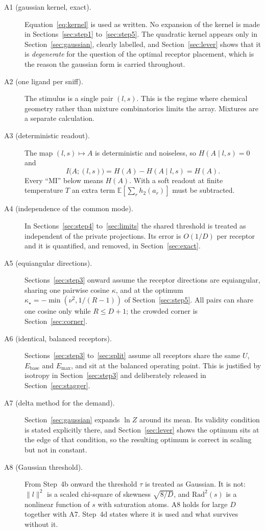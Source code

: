 \documentclass[11pt,a4paper]{article}
\newcommand{\EE}{\mathbb{E}}
\newcommand{\htwo}{h_2}
\newcommand{\Ebase}{E_{\mathrm{base}}}
\newcommand{\Emax}{E_{\mathrm{max}}}
\begin{document}
\begin{description}
  \item[A1 (gaussian kernel, exact).] Equation~\eqref{eq:kernel} is used as written. No
    expansion of the kernel is made in Sections~\ref{sec:step1} to~\ref{sec:step5}. The
    quadratic kernel appears only in Section~\ref{sec:gaussian}, clearly labelled, and
    Section~\ref{sec:lever} shows that it is \emph{degenerate} for the question of the
    optimal receptor placement, which is the reason the gaussian form is carried
    throughout.
  \item[A2 (one ligand per sniff).] The stimulus is a single pair $(l,s)$. This is the
    regime where chemical geometry rather than mixture combinatorics limits the array.
    Mixtures are a separate calculation.
  \item[A3 (deterministic readout).] The map $(l,s)\mapsto A$ is deterministic and
    noiseless, so $H(A\mid l,s)=0$ and
    \begin{equation}
      I\big(A;(l,s)\big) = H(A) - H(A\mid l,s) = H(A).
      \label{eq:MIisH}
    \end{equation}
    Every ``MI'' below means $H(A)$. With a soft readout at finite temperature $T$ an
    extra term $\EE[\sum_r \htwo(a_r)]$ must be subtracted.
  \item[A4 (independence of the common mode).] In Sections~\ref{sec:step4}
    to~\ref{sec:limits} the shared threshold is treated as independent of the private
    projections. Its error is $O(1/D)$ per receptor and it is quantified, and removed, in
    Section~\ref{sec:exact}.
  \item[A5 (equiangular directions).] Sections~\ref{sec:step3} onward assume the receptor
    directions are equiangular, sharing one pairwise cosine $\kappa$, and at the optimum
    $\kappa_\star=-\min(\nu^2,1/(R-1))$ of Section~\ref{sec:step5}. All pairs can share one
    cosine only while $R\le D+1$; the crowded corner is Section~\ref{sec:corner}.
  \item[A6 (identical, balanced receptors).] Sections~\ref{sec:step3}
    to~\ref{sec:split} assume all receptors share the same $U$, $\Ebase$ and $\Emax$, and
    sit at the balanced operating point. This is justified by isotropy in
    Section~\ref{sec:step3} and deliberately released in Section~\ref{sec:stagger}.
  \item[A7 (delta method for the demand).] Section~\ref{sec:gaussian} expands
    $\ln Z$ around its mean. Its validity condition is stated explicitly there, and
    Section~\ref{sec:lever} shows the optimum sits at the edge of that condition, so the
    resulting optimum is correct in scaling but not in constant.
  \item[A8 (Gaussian threshold).] From Step~4b onward the threshold $\tau$ is treated as
    Gaussian. It is not: $\|l\|^2$ is a scaled chi-square of skewness $\sqrt{8/D}$, and
    $\mathrm{Rad}^2(s)$ is a nonlinear function of $s$ with saturation atoms. A8 holds
    for large $D$ together with A7. Step~4d states where it is used and what survives
    without it.
\end{description}
\end{document}
